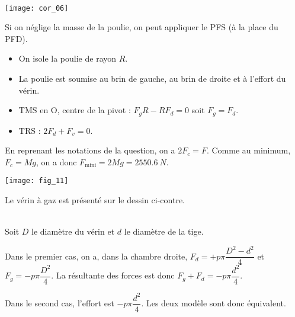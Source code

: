 \ifprof
\begin{corrige}~\\

\begin{center}
\texttt{[image: cor\_06]}
\end{center}

Si on néglige la masse de la poulie, on peut appliquer le PFS (à la place du PFD).

\begin{itemize}
\item On isole la poulie de rayon $R$.
\item La poulie est soumise au brin de gauche, au brin de droite et à l'effort du vérin.
\item TMS en O, centre de la pivot : $F_g R -R F_d = 0$ soit $F_g =F_d$. 
\item TRS : $2F_d+ F_v = 0$. 
\end{itemize}
En reprenant les notations de la question, on a $2F_c = F$.
Comme au minimum, $F_c = Mg$, on a donc $F_{\text{mini}} = 2 Mg = \SI{2550,6}{N}$.
\end{corrige}
\else
\fi

\ifprof
\else
\begin{marginfigure}
\texttt{[image: fig\_11]}
\end{marginfigure}
Le vérin à gaz est présenté sur le dessin ci-contre.

\fi

\ifprof
\begin{corrige}~\\
Soit $D$ le diamètre du vérin et $d$ le diamètre de la tige. 

Dans le premier cas, on a, dans la chambre droite, $F_d = + p \pi\dfrac{D^2 - d^2}{4}$ et $F_g =- p \pi\dfrac{D^2}{4}$. La résultante des forces est donc  $F_g +F_d=-p \pi\dfrac{d^2}{4}$.

Dans le second cas, l'effort est $-p \pi\dfrac{d^2}{4}$. Les deux modèle sont donc équivalent.
\end{corrige}
\else
\fi

